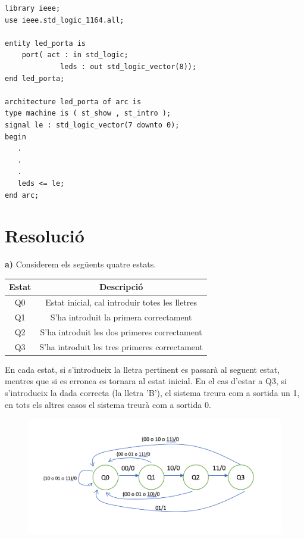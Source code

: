 \documentclass[12pt, a4papre]{article}
\begin{document}
	\begin{lstlisting}[style=vhdl, frame=single, basicstyle=\small]
library ieee;
use ieee.std_logic_1164.all;

entity led_porta is
    port( act : in std_logic;  
             leds : out std_logic_vector(8));
end led_porta;

architecture led_porta of arc is
type machine is ( st_show , st_intro );
signal le : std_logic_vector(7 downto 0);
begin
   .
   .
   .
   leds <= le;
end arc;
	\end{lstlisting}
	
	\newpage
	
	\section{Resolució} 
	
	\textbf{a)} Considerem els següents quatre estats.
	
	\begin{table}[h!]
		\centering
		 \begin{tabular}{|c | c|} 
			 \hline
			 Estat & Descripció\\ [0.5ex] 
			 \hline\hline
			  Q0 &  Estat inicial, cal introduir totes les lletres\\ 
			  \hline
			  Q1 &  S'ha introduit la primera correctament\\ 
			 \hline
			 Q2 & S'ha introduit les dos primeres correctament\\ [0.5ex] 
			 \hline
			 Q3 & S'ha introduit les tres primeres correctament\\ 
			 \hline
		 \end{tabular}
	\end{table}
	
	En cada estat, si s'introdueix la lletra pertinent es passarà al seguent estat, mentres que si es erronea es tornara al estat inicial. En el cas d'estar a Q3, si s'introdueix la dada correcta (la lletra 'B'), el sistema treura com a sortida un 1, en tots els altres casos el sistema treurà com a sortida 0.
	
	\begin{figure}[H]
		\begin{center}
		\includegraphics[width=130mm]{ApartatA.png}
		\end{center}
	\end{figure}
	
\end{document}
